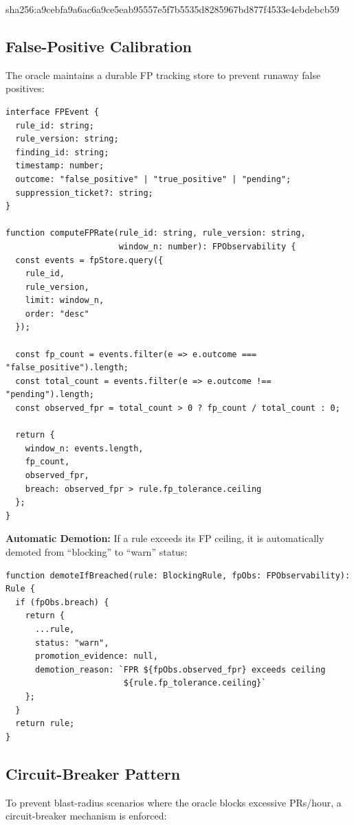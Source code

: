 \documentclass[11pt,a4paper]{article}
\begin{document}
sha256:a9cebfa9a6ac6a9ce5eab95557e5f7b5535d8285967bd877f4533e4ebdebcb59

\subsection{False-Positive Calibration}

The oracle maintains a durable FP tracking store to prevent runaway false positives:

\begin{verbatim}
interface FPEvent {
  rule_id: string;
  rule_version: string;
  finding_id: string;
  timestamp: number;
  outcome: "false_positive" | "true_positive" | "pending";
  suppression_ticket?: string;
}

function computeFPRate(rule_id: string, rule_version: string, 
                       window_n: number): FPObservability {
  const events = fpStore.query({
    rule_id,
    rule_version,
    limit: window_n,
    order: "desc"
  });
  
  const fp_count = events.filter(e => e.outcome === "false_positive").length;
  const total_count = events.filter(e => e.outcome !== "pending").length;
  const observed_fpr = total_count > 0 ? fp_count / total_count : 0;
  
  return {
    window_n: events.length,
    fp_count,
    observed_fpr,
    breach: observed_fpr > rule.fp_tolerance.ceiling
  };
}
\end{verbatim}

\textbf{Automatic Demotion:} If a rule exceeds its FP ceiling, it is automatically demoted from ``blocking'' to ``warn'' status:

\begin{verbatim}
function demoteIfBreached(rule: BlockingRule, fpObs: FPObservability): Rule {
  if (fpObs.breach) {
    return {
      ...rule,
      status: "warn",
      promotion_evidence: null,
      demotion_reason: `FPR ${fpObs.observed_fpr} exceeds ceiling 
                        ${rule.fp_tolerance.ceiling}`
    };
  }
  return rule;
}
\end{verbatim}

\subsection{Circuit-Breaker Pattern}

To prevent blast-radius scenarios where the oracle blocks excessive PRs/hour, a circuit-breaker mechanism is enforced:
\end{document}
